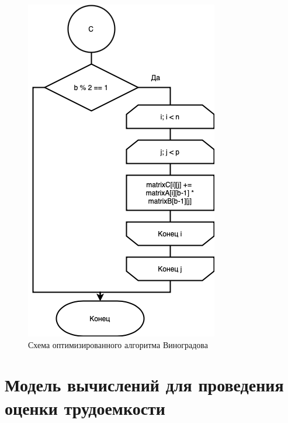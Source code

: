 \begin{figure}[h]
    \centering
    \includegraphics[width=0.6\linewidth]{img/WinogradOptD.jpg}
    \caption{Схема оптимизированного алгоритма Виноградова}
    \label{fig:mpr}
\end{figure}

\clearpage

\section{Модель вычислений для проведения оценки трудоемкости}


